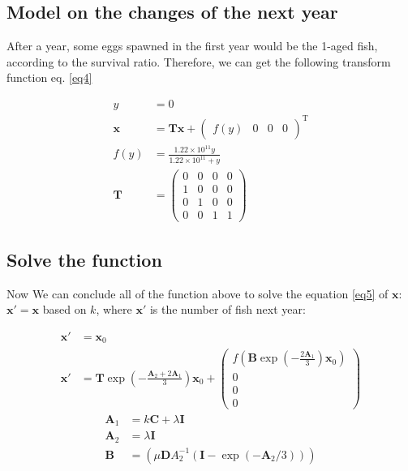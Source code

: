 \documentclass{IEEEtran}
\begin{document}
\subsection{Model on the changes of the next year}

After a year, some eggs spawned in the first year would be the 1-aged fish, according to the survival ratio. Therefore, we can get the following transform function eq. \ref{eq4}

\begin{align}
    \label{eq4}
    y &= 0\\
    \bm x &= \pmb T \bm x +\begin{pmatrix} f(y)&0&0&0\end{pmatrix}^{\mathrm T}\\
    f(y) &= \frac{1.22\times 10 ^{11}y}{1.22\times 10 ^{11} + y}\\
    \pmb T &= \begin{pmatrix} 0 & 0 & 0 & 0 \\ 1& 0 & 0 & 0 \\ 0 & 1 & 0 & 0 \\0 & 0 & 1 & 1 \end{pmatrix}
\end{align}

\subsection{Solve the function}

Now We can conclude all of the function above to solve the equation \ref{eq5} of $\bm x$: $\bm x' = \bm x$ based on $k$, where $\bm x'$ is the number of fish next year:  

\begin{align}
    \bm x' &= \bm x_0\\
    \label{eq5}
    \bm x' &= \pmb T \exp(-\frac{\pmb A_2 + 2 \pmb A_1}{3})\bm x_0 +\begin{pmatrix} f(\pmb B \exp(-\frac{2\pmb A_1}{3})\bm x_0)\\0\\0\\0\end{pmatrix}
\end{align}
\begin{align}
    \pmb A_1 &= k\pmb C + \lambda \pmb I\\
    \pmb A_2 &= \lambda \pmb I\\
    \pmb B &= (\mu \pmb D A_2^{-1}(\pmb I - \exp(-\pmb A_2/3)))
\end{align}
\end{document}
